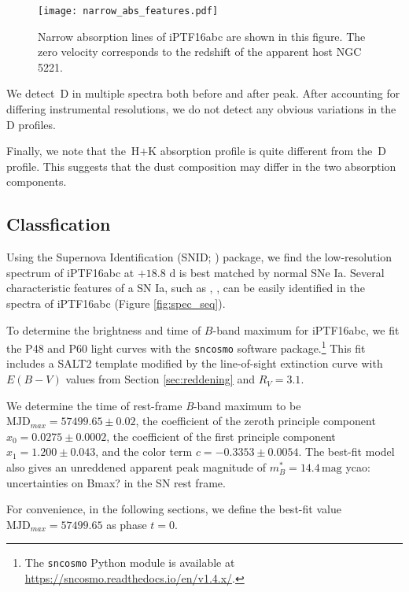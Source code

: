 \documentclass[twocolumn]{aastex61}
\newcommand{\ycao}[1]{{\color{red} ycao: {#1}}}
\begin{document}
\begin{figure}[htb]
  \centering
  \texttt{[image: narrow\_abs\_features.pdf]}
  \caption{Narrow absorption lines of iPTF16abc are shown in this
    figure. The zero velocity corresponds to the redshift of the
    apparent host NGC\,5221.}
  \label{fig:narrow_features}
\end{figure}

We detect \,D in multiple spectra both before and after peak. After accounting for differing instrumental resolutions, we do not detect any obvious variations in the \,D profiles.

Finally, we note that the \,H$+$K absorption profile is quite different from the \,D profile. 
This suggests that the dust composition may differ in the two absorption components. 

\subsection{Classfication}
\label{sec:classification}

Using the Supernova Identification (SNID; \citealt{2007ApJ...666.1024B}) package, 
we find the low-resolution spectrum of iPTF16abc at $+18.8$ d is best matched by normal SNe Ia. Several characteristic features of a SN
Ia, such as , , can be easily identified in the
spectra of iPTF16abc (Figure \ref{fig:spec_seq}).

To determine the brightness and time of $B$-band maximum for 
iPTF16abc, we fit the P48 and P60 light curves with the \texttt{sncosmo} software package.\footnote{The
  \texttt{sncosmo} Python module is available at
  \url{https://sncosmo.readthedocs.io/en/v1.4.x/}.} This fit includes a SALT2 template \citep{2007A&A...466...11G} modified by the line-of-sight extinction
curve \citep{1999PASP..111...63F} with $E(B-V)$ values from Section
\ref{sec:reddening} and $R_V=3.1$.

We determine the time of rest-frame \textit{B}-band maximum to be 
 $\textrm{MJD}_{max}=57499.65\pm0.02$, the coefficient
of the zeroth principle component $x_0=0.0275\pm0.0002$, the
coefficient of the first principle component $x_1=1.200\pm0.043$, and
the color term $c=-0.3353\pm0.0054$. The best-fit model also gives an
unreddened apparent peak magnitude of $m^*_{B}=14.4\,\textrm{mag}$ \ycao{uncertainties on Bmax?} in
the SN rest frame.

For convenience, in the following sections, we define the best-fit
value $\textrm{MJD}_{max}=57499.65$ as phase $t=0$.
\end{document}
